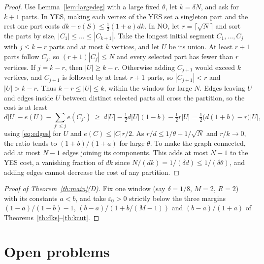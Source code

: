 \documentclass[11pt,letterpaper]{article}
\theoremstyle{definition}
\theoremstyle{remark}
\newcommand{\eps}{\varepsilon}
\begin{document}
\begin{proof}
Use Lemma~\ref{lem:largedeg} with a large fixed \(\theta\), let
\(k=\delta N\), and ask for \(k+1\) parts. In YES, making each vertex of the
YES set a singleton part and the rest one part costs
\(dk-e(S)\le\frac12(1+a)dk\). In NO, let \(r=\lceil\sqrt N\rceil\) and sort
the parts by size, \(|C_1|\le\dots\le|C_{k+1}|\). Take the longest initial
segment \(C_1,\dots,C_j\) with \(j\le k-r\) parts and at most \(k\) vertices,
and let \(U\) be its union. At least \(r+1\) parts follow \(C_j\), so
\((r+1)|C_j|\le N\) and every selected part has fewer than \(r\) vertices.
If \(j=k-r\), then \(|U|\ge k-r\). Otherwise adding \(C_{j+1}\) would exceed
\(k\) vertices, and \(C_{j+1}\) is followed by at least \(r+1\) parts, so
\(|C_{j+1}|<r\) and \(|U|>k-r\). Thus \(k-r\le|U|\le k\), within the window
for large \(N\). Edges leaving \(U\) and edges inside \(U\) between distinct
selected parts all cross the partition, so the cost is at least
\[
d|U|-e(U)-\sum_{j'\le j}e(C_{j'})\ \ge\ d|U|-\tfrac12d|U|(1-b)-\tfrac12r|U|
=\tfrac12\bigl(d(1+b)-r\bigr)|U|,
\]
using \eqref{eq:edges} for \(U\) and \(e(C)\le|C|r/2\). As \(r/d\le
1/\theta+1/\sqrt N\) and \(r/k\to0\), the ratio tends to \((1+b)/(1+a)\) for
large \(\theta\). To make the graph connected, add at most \(N-1\) edges
joining its components. This adds at most \(N-1\) to the YES cost, a
vanishing fraction of \(dk\) since \(N/(dk)=1/(\delta d)\le1/(\delta\theta)\),
and adding edges cannot decrease the cost of any partition.
\end{proof}

\begin{proof}[Proof of Theorem~\ref{th:main}(D)]
Fix one window (say \(\delta=1/8\), \(M=2\), \(R=2\)) with its constants
\(a<b\), and take \(\eps_0>0\) strictly below the three margins
\((1-a)/(1-b)-1\), \((b-a)/(1+b/(M-1))\) and \((b-a)/(1+a)\) of
Theorems~\ref{th:dks}--\ref{th:kcut}.
\end{proof}

\section{Open problems}\label{sec:open}
\end{document}
